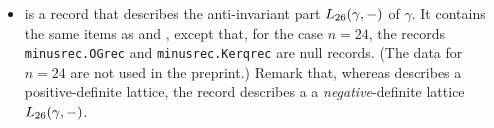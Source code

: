 \documentclass{amsart} %
\begin{document}
\begin{itemize}
\begin{itemize}
\begin{itemize}
written as a vector  of length $26$ with respect to  .
\item {}
is the Gram matrix of $\Lts(\gamma, +)$
with respect to the  above.
\end{itemize}
%
%
\begin{itemize}
\item {}
is the set $\Xi_{\tau}$
when $n\ne 24$,
and is {\tt "not available"} when $n=24$.
For $n\ne 24$,
each element of  is written as a vector 
of length $24$ with respect to .
(The  set $\Xi_{\tau}$ for $n=24$ is not used in the preprint.)
\end{itemize}
%
\item {}  
is a record that describes the anti-invariant part $L_{26}(\gamma, -)$ of $\gamma$.
It  contains the same items as  and  ,
except that,
for the case  $n=24$,
the records {\tt minusrec.OGrec} and {\tt minusrec.Kerqrec}
are null records.
(The data for $n=24$ are not used in the preprint.)
Remark that,
whereas  describes a positive-definite lattice,
the record  describes a  a \emph{negative}-definite lattice $L_{26}(\gamma, -)$.

%
 \end{itemize}
%
%
 \end{itemize}
%


%
\end{document}
